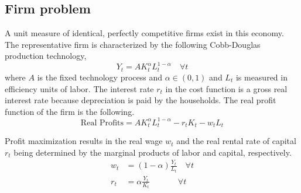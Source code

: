 \documentclass[letterpaper,12pt]{article}
\theoremstyle{definition}
\begin{document}
\begin{spacing}{1.5}


  \subsection{Firm problem}\label{SecModelGenFirm}

    A unit measure of identical, perfectly competitive firms exist in this economy. The representative firm is characterized by the following Cobb-Douglas production technology,
    \begin{equation}\label{EqCobbDougProd}
       Y_t = A K_t^\alpha L_t^{1-\alpha} \quad \forall t
    \end{equation}
    where $A$ is the fixed technology process and $\alpha\in(0,1)$ and $L_t$ is measured in efficiency units of labor. The interest rate $r_t$ in the cost function is a gross real interest rate because depreciation is paid by the households. The real profit function of the firm is the following.
    \begin{equation}\label{EqFirmProfit}
       \text{Real Profits} = A K_t^\alpha L_t^{1-\alpha} - r_t K_t - w_t L_t
    \end{equation}

    Profit maximization results in the real wage $w_t$ and the real rental rate of capital $r_t$ being determined by the marginal products of labor and capital, respectively.
    \begin{align}
       w_t &= (1-\alpha)\frac{Y_t}{L_t} \quad \forall t \label{EqFOCwage}\\
       r_t &= \alpha\frac{Y_t}{K_t} \quad\quad\quad\:\: \forall t \label{EqFOCrate}
    \end{align}



\end{spacing}
\end{document}
